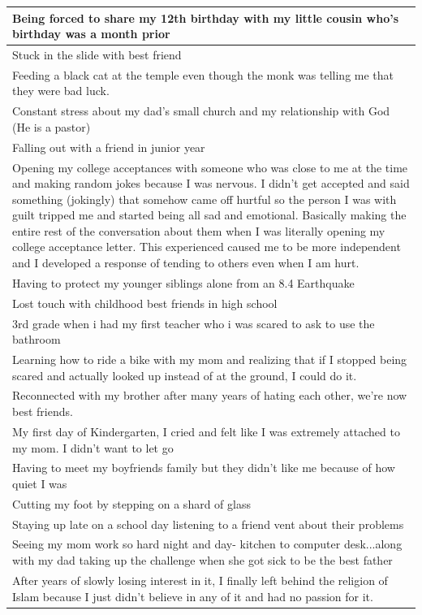 \documentclass[
  .7em,
  letterpaper,
  DIV=11,
  numbers=noendperiod]{scrartcl}
\begin{document}
\begin{table}
\begin{tabular}{l}
\hline
Being forced to share my 12th birthday with my little cousin who's birthday was a month prior\\
\hline
Stuck in the slide with best friend\\
\hline
Feeding a black cat at the temple even though the monk was telling me that they were bad luck.\\
\hline
Constant stress about my dad's small church and my relationship with God (He is a pastor)\\
\hline
Falling out with a friend in junior year\\
\hline
Opening my college acceptances with someone who was close to me at the time and making random jokes because I was nervous. I didn't get accepted and said something (jokingly) that somehow came off hurtful so the person I was with guilt tripped me and started being all sad and emotional. Basically making the entire rest of the conversation about them when I was literally opening my college acceptance letter. This experienced caused me to be more independent and I developed a response of tending to others even when I am hurt.\\
\hline
Having to protect my younger siblings alone from an 8.4 Earthquake\\
\hline
Lost touch with childhood best friends in high school\\
\hline
3rd grade when i had my first teacher who i was scared to ask to use the bathroom\\
\hline
Learning how to ride a bike with my mom and realizing that if I stopped being scared and actually looked up instead of at the ground, I could do it.\\
\hline
Reconnected with my brother after many years of hating each other, we're now best friends.\\
\hline
My first day of Kindergarten, I cried and felt like I was extremely attached to my mom. I didn't want to let go\\
\hline
Having to meet my boyfriends family but they didn't like me because of how quiet I was\\
\hline
Cutting my foot by stepping on a shard of glass\\
\hline
Staying up late on a school day listening to a friend vent about their problems\\
\hline
Seeing my mom work so hard night and day- kitchen to computer desk...along with my dad taking up the challenge when she got sick to be the best father\\
\hline
After years of slowly losing interest in it, I finally left behind the religion of Islam because I just didn't believe in any of it and had no passion for it.\\

\end{tabular}
\end{table}
\end{document}

